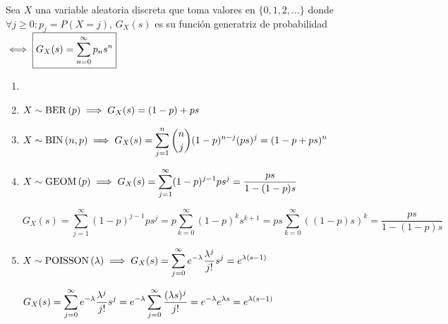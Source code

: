 \begin{defn}
	Sea $X$ una variable aleatoria discreta que toma valores en $\{0, 1, 2, \dots\}$ donde $\forall j \geq 0 : p_j=P(X=j)$, $G_X(s)$ es su función generatriz de probabilidad $\displaystyle \iff \boxed{G_X(s)=\sum_{n=0}^\infty p_ns^n}$
\end{defn}
\begin{ejem}
	\begin{enumerate}
		\item[]
		\item $\displaystyle X \sim \operatorname{BER}\left(p\right) \implies G_X(s)=(1-p)+ps$
		\item $\displaystyle X \sim \operatorname{BIN}\left(n, p\right) \implies G_X(s)= \sum_{j=1}^{n} \binom{n}{j} (1-p)^{n-j}(ps)^j = (1-p+ps)^n$
		\item $\displaystyle X \sim \operatorname{GEOM}\left(p\right) \implies G_X(s)=\sum_{j=1}^\infty (1-p)^{j-1}ps^j = \frac{ps}{1-(1-p)s}$
		      \begin{dem}
			      \[G_X(s) = \sum_{j=1}^\infty (1-p)^{j-1}ps^j = p\sum_{k=0}^\infty (1-p)^{k}s^{k+1} = ps\sum_{k=0}^\infty ((1-p)s)^{k} = \frac{ps}{1-(1-p)s}\]
		      \end{dem}
		\item $\displaystyle X \sim \operatorname{POISSON}\left(\lambda\right) \implies G_X(s)=\sum_{j=0}^\infty e^{-\lambda}\frac{\lambda^j}{j!}s^j = e^{\lambda(s-1)}$
		      \begin{dem}
			      $\displaystyle G_X(s) = \sum_{j=0}^\infty e^{-\lambda}\frac{\lambda^j}{j!}s^j = e^{-\lambda}\sum_{j=0}^\infty \frac{(\lambda s)^j}{j!} = e^{-\lambda}e^{\lambda s} = e^{\lambda(s-1)}$
		      \end{dem}
	\end{enumerate}
\end{ejem}


